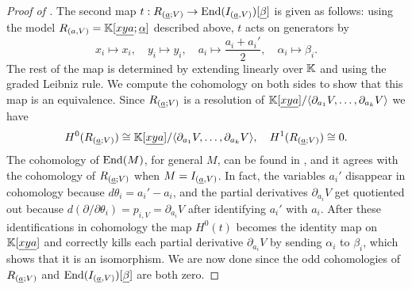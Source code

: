 \begin{proof}[Proof of ]
	The second map $t : R_{(\underline{a};V)} \to \mathrm{End}(I_{(\underline{a},V)})[\underline{\beta}]$ is given as follows: using the model $R_{(a, V)} = \mathbb{K}[\underline{xya}; \underline{\alpha}]$ described above, $t$ acts on generators by
	\begin{equation*}
		x_i \mapsto x_i, \quad y_i \mapsto y_i, \quad a_i \mapsto \frac{a_i + a_i'}{2}, \quad \alpha_i \mapsto \beta_i.
	\end{equation*}
	The rest of the map is determined by extending linearly over $\mathbb{K}$ and using the graded Leibniz rule. We compute the cohomology on both sides to show that this map is an equivalence. Since $R_{(\underline{a};V)}$ is a resolution of $\mathbb{K}[\underline{xya}]/\langle \partial_{a_1} V, \dotsc, \partial_{a_k} V \rangle$ we have
	\begin{equation*}
		H^0(R_{(\underline{a};V)}) \cong \mathbb{K}[\underline{xya}]/\langle \partial_{a_1} V, \dotsc, \partial_{a_k} V \rangle, \quad H^1(R_{(\underline{a};V)}) \cong 0.
	\end{equation*}
	The cohomology of $\mathrm{End}(M)$, for general $M$, can be found in \cite[Section 4]{KR2008}, and it agrees with the cohomology of $R_{(\underline{a};V)}$ when $M = I_{(\underline{a}, V)}$. In fact, the variables $a_i'$ disappear in cohomology because $d\theta_i = a_i' - a_i$, and the partial derivatives $\partial_{a_i} V$ get quotiented out because $d (\partial/\partial \theta_i) = p_{i, V} = \partial_{a_i} V$ after identifying $a_i'$ with $a_i$. After these identifications in cohomology the map $H^0(t)$ becomes the identity map on $\mathbb{K}[\underline{xya}]$ and correctly kills each partial derivative $\partial_{a_i} V$ by sending $\alpha_i$ to $\beta_i$, which shows that it is an isomorphism. We are now done since the odd cohomologies of $R_{(\underline{a};V)}$ and $\mathrm{End}(I_{(\underline{a},V)})[\underline{\beta}]$ are both zero.
\end{proof}

